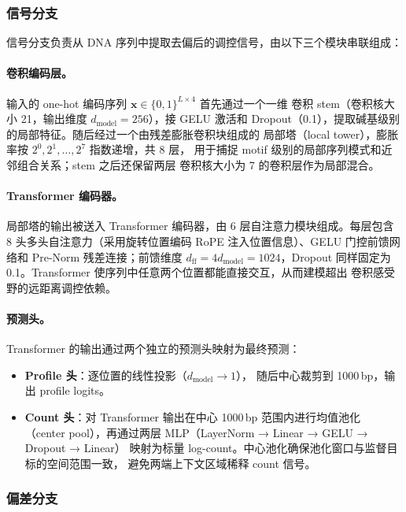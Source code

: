 \documentclass[11pt,a4paper]{ctexart}
\begin{document}
\subsubsection{信号分支}

信号分支负责从 DNA 序列中提取去偏后的调控信号，由以下三个模块串联组成：

\paragraph{卷积编码层。}
输入的 one-hot 编码序列 $\mathbf{x} \in \{0,1\}^{L \times 4}$ 首先通过一个一维
卷积 stem（卷积核大小 21，输出维度 $d_{\text{model}}=256$），接 GELU 激活和
Dropout（0.1），提取碱基级别的局部特征。随后经过一个由残差膨胀卷积块组成的
局部塔（local tower），膨胀率按 $2^0, 2^1, \ldots, 2^7$ 指数递增，共 8 层，
用于捕捉 motif 级别的局部序列模式和近邻组合关系；stem 之后还保留两层
卷积核大小为 7 的卷积层作为局部混合。

\paragraph{Transformer 编码器。}
局部塔的输出被送入 Transformer 编码器，由 6 层自注意力模块组成。每层包含
8 头多头自注意力（采用旋转位置编码 RoPE 注入位置信息）、GELU 门控前馈网络和
Pre-Norm 残差连接；前馈维度 $d_{\text{ff}}=4d_{\text{model}}=1024$，Dropout
同样固定为 0.1。Transformer 使序列中任意两个位置都能直接交互，从而建模超出
卷积感受野的远距离调控依赖。

\paragraph{预测头。}
Transformer 的输出通过两个独立的预测头映射为最终预测：

\begin{itemize}[leftmargin=2em]
  \item \textbf{Profile 头}：逐位置的线性投影（$d_{\text{model}} \to 1$），
  随后中心裁剪到 1000\,bp，输出 profile logits。
  \item \textbf{Count 头}：对 Transformer 输出在中心 1000\,bp 范围内进行均值池化
  （center pool），再通过两层 MLP（LayerNorm → Linear → GELU → Dropout → Linear）
  映射为标量 log-count。中心池化确保池化窗口与监督目标的空间范围一致，
  避免两端上下文区域稀释 count 信号。
\end{itemize}

\subsubsection{偏差分支}
\end{document}
